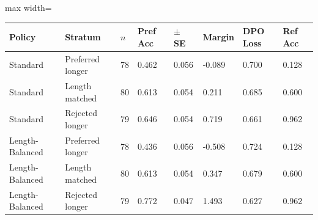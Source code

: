 \begin{adjustbox}{max width=\linewidth}
\begin{tabular}{llllllll}
\toprule
Policy & Stratum & $n$ & Pref Acc & $\pm$ SE & Margin & DPO Loss & Ref Acc \\
\midrule
Standard & Preferred longer & 78 & 0.462 & 0.056 & -0.089 & 0.700 & 0.128 \\
Standard & Length matched & 80 & 0.613 & 0.054 & 0.211 & 0.685 & 0.600 \\
Standard & Rejected longer & 79 & 0.646 & 0.054 & 0.719 & 0.661 & 0.962 \\
Length-Balanced & Preferred longer & 78 & 0.436 & 0.056 & -0.508 & 0.724 & 0.128 \\
Length-Balanced & Length matched & 80 & 0.613 & 0.054 & 0.347 & 0.679 & 0.600 \\
Length-Balanced & Rejected longer & 79 & 0.772 & 0.047 & 1.493 & 0.627 & 0.962 \\
\bottomrule
\end{tabular}
\end{adjustbox}
